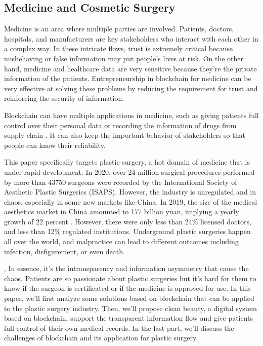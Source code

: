 \documentclass{article}
\begin{document}
\subsection{Medicine and Cosmetic Surgery}
Medicine is an area where multiple parties are involved. Patients, doctors, hospitals, and manufacturers are key stakeholders who interact with each other in a complex way. In these intricate flows, trust is extremely critical because misbehaving or false information may put people's lives at risk. On the other hand, medicine and healthcare data are very sensitive because they're the private information of the patients. Entrepreneurship in blockchain for medicine can be very effective at solving these problems by reducing the requirement for trust and reinforcing the security of information.
\par Blockchain can have multiple applications in medicine, such as giving patients full control over their personal data or recording the information of drugs from supply chain \cite{Review}. It can also keep the important behavior of stakeholders so that people can know their reliability.
\par This paper specifically targets plastic surgery, a hot domain of medicine that is under rapid development. In 2020, over 24 million surgical procedures performed by more than 43750 surgeons were recorded by the International Society of Aesthetic Plastic Surgeries (ISAPS)\cite{ISAPS}. However, the industry is unregulated and in chaos, especially in some new markets like China. In 2019, the size of the medical aesthetics market in China amounted to 177 billion yuan, implying a yearly growth of 22 percent \cite{ChinaMarket}. However, there were only less than 24\% licensed doctors, and less than 12\% regulated institutions\cite{ChinaReport}. Underground plastic surgeries happen 
all over the world, and malpractice can lead to different outcomes including infection, disfigurement, or even death.
\par, In essence, it's the intransparency and information asymmetry that cause the chaos. Patients are so passionate about plastic surgeries but it's hard for them to know if the surgeon is certificated or if the medicine is approved for use. In this paper, we'll first analyze some solutions based on blockchain that can be applied to the plastic surgery industry. Then, we'll propose clean beauty, a digital system based on blockchain, support the transparent information flow and give patients full control of their own medical records. In the last part, we'll discuss the challenges of blockchain and its application for plastic surgery.
\end{document}
